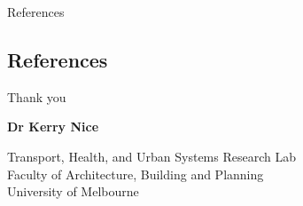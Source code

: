 \documentclass{beamer}
\begin{document}


\begin{frame}[shrink=25]{References}
\begin{multicols}{2}
\section*{References}
%
%

\end{multicols}
\end{frame}

\begin{frame}{Thank you}
\begin{center}
\textbf{Dr Kerry Nice} 

Transport, Health, and Urban Systems Research Lab\\ Faculty of Architecture, Building and Planning\\ University of Melbourne




\end{center}
\end{frame}
\end{document}
